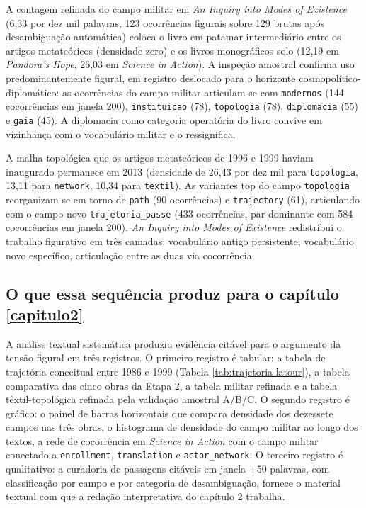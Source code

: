 A contagem refinada do campo militar em \emph{An Inquiry into Modes of Existence} (6,33 por dez mil palavras, 123 ocorrências figurais sobre 129 brutas após desambiguação automática) coloca o livro em patamar intermediário entre os artigos metateóricos (densidade zero) e os livros monográficos solo (12,19 em \emph{Pandora's Hope}, 26,03 em \emph{Science in Action}). A inspeção amostral confirma uso predominantemente figural, em registro deslocado para o horizonte cosmopolítico-diplomático: as ocorrências do campo militar articulam-se com \texttt{modernos} (144 cocorrências em janela 200), \texttt{instituicao} (78), \texttt{topologia} (78), \texttt{diplomacia} (55) e \texttt{gaia} (45). A diplomacia como categoria operatória do livro convive em vizinhança com o vocabulário militar e o ressignifica.

A malha topológica que os artigos metateóricos de 1996 e 1999 haviam inaugurado permanece em 2013 (densidade de 26,43 por dez mil para \texttt{topologia}, 13,11 para \texttt{network}, 10,34 para \texttt{textil}). As variantes top do campo \texttt{topologia} reorganizam-se em torno de \texttt{path} (90 ocorrências) e \texttt{trajectory} (61), articulando com o campo novo \texttt{trajetoria\_passe} (433 ocorrências, par dominante com 584 cocorrências em janela 200). \emph{An Inquiry into Modes of Existence} redistribui o trabalho figurativo em três camadas: vocabulário antigo persistente, vocabulário novo específico, articulação entre as duas via cocorrência.

\subsection{O que essa sequência produz para o capítulo \ref{capitulo2}}

A análise textual sistemática produziu evidência citável para o argumento da tensão figural em três registros. O primeiro registro é tabular: a tabela de trajetória conceitual entre 1986 e 1999 (Tabela \ref{tab:trajetoria-latour}), a tabela comparativa das cinco obras da Etapa 2, a tabela militar refinada e a tabela têxtil-topológica refinada pela validação amostral A/B/C. O segundo registro é gráfico: o painel de barras horizontais que compara densidade dos dezessete campos nas três obras, o histograma de densidade do campo militar ao longo dos textos, a rede de cocorrência em \emph{Science in Action} com o campo militar conectado a \texttt{enrollment}, \texttt{translation} e \texttt{actor\_network}. O terceiro registro é qualitativo: a curadoria de passagens citáveis em janela $\pm 50$ palavras, com classificação por campo e por categoria de desambiguação, fornece o material textual com que a redação interpretativa do capítulo 2 trabalha.

